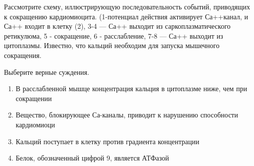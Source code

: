 
Рассмотрите схему,
иллюстрирующую последовательность событий, приводящих к сокращению
кардиомиоцита. (1-потенциал действия активирует Са++канал, и \linebreak Са++ входит в
клетку (2), 3-4 — Са++ выходит из саркоплазматического ретикулюма, 5 -
сокращение, 6 - расслабление, 7-8 — Са++ выходит из цитоплазмы. Известно, что кальций необходим для
запуска мышечного сокращения.

Выберите верные суждения.


\begin{enumerate}
    \item В расслабленной мышце концентрация кальция в цитоплазме ниже, чем при сокращении
    \item Вещество, блокирующее Са-каналы, приводит к нарушению способности кардиомиоци
    \item Кальций поступает в клетку против градиента концентрации
    \item Белок, обозначенный цифрой 9, является АТФазой
\end{enumerate}

